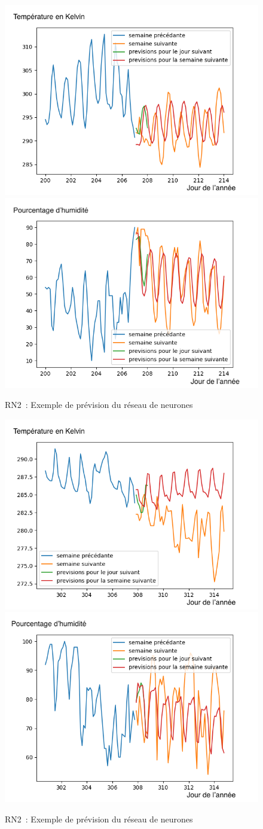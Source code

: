 \documentclass[11pt,a4paper]{article}
\begin{document}
\begin{figure} [H]
\centering
\includegraphics[width=0.48 \textwidth]{imagesTIPE/imagesIA/dessinTempIA200.png}\quad
\includegraphics[width=0.48 \textwidth]{imagesTIPE/imagesIA/dessinHumiIA200.png}
\caption{\label{fig:cosDS3} RN2~: Exemple de prévision du réseau de neurones}
\end{figure}
\begin{figure} [H]
\centering
\includegraphics[width=0.48 \textwidth]{imagesTIPE/imagesIA/dessinTempIA300,75.png}\quad
\includegraphics[width=0.48 \textwidth]{imagesTIPE/imagesIA/dessinHumiIA300,75.png}
\caption{\label{fig:cosDS} RN2~: Exemple de prévision du réseau de neurones}
\end{figure}
\end{document}
